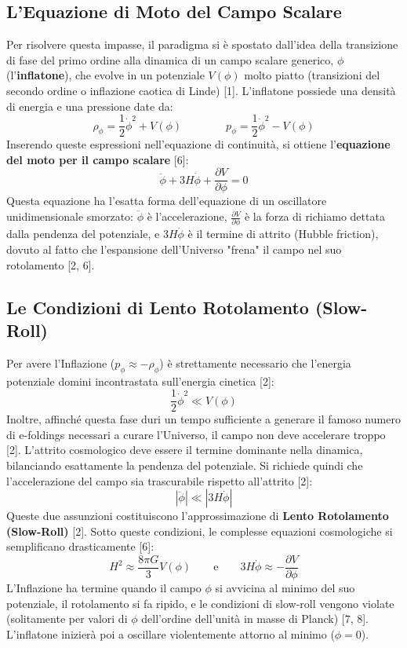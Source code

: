 \documentclass[11pt,a4paper]{report}
\begin{document}
\subsection{L'Equazione di Moto del Campo Scalare}
Per risolvere questa impasse, il paradigma si è spostato dall'idea della transizione di fase del primo ordine alla dinamica di un campo scalare generico, $\phi$ (l'\textbf{inflatone}), che evolve in un potenziale $V(\phi)$ molto piatto (transizioni del secondo ordine o inflazione caotica di Linde) [1].
L'inflatone possiede una densità di energia e una pressione date da:
\begin{equation}
\rho_\phi = \frac{1}{2}\dot{\phi}^2 + V(\phi) \qquad \qquad p_\phi = \frac{1}{2}\dot{\phi}^2 - V(\phi)
\end{equation}
Inserendo queste espressioni nell'equazione di continuità, si ottiene l'\textbf{equazione del moto per il campo scalare} [6]:
\begin{equation}
\ddot{\phi} + 3H\dot{\phi} + \frac{\partial V}{\partial \phi} = 0
\end{equation}
Questa equazione ha l'esatta forma dell'equazione di un oscillatore unidimensionale smorzato: $\ddot{\phi}$ è l'accelerazione, $\frac{\partial V}{\partial \phi}$ è la forza di richiamo dettata dalla pendenza del potenziale, e $3H\dot{\phi}$ è il termine di attrito (Hubble friction), dovuto al fatto che l'espansione dell'Universo "frena" il campo nel suo rotolamento [2, 6].

\subsection{Le Condizioni di Lento Rotolamento (Slow-Roll)}
Per avere l'Inflazione ($p_\phi \approx -\rho_\phi$) è strettamente necessario che l'energia potenziale domini incontrastata sull'energia cinetica [2]:
\begin{equation}
\frac{1}{2}\dot{\phi}^2 \ll V(\phi)
\end{equation}
Inoltre, affinché questa fase duri un tempo sufficiente a generare il famoso numero di e-foldings necessari a curare l'Universo, il campo non deve accelerare troppo [2]. L'attrito cosmologico deve essere il termine dominante nella dinamica, bilanciando esattamente la pendenza del potenziale. Si richiede quindi che l'accelerazione del campo sia trascurabile rispetto all'attrito [2]:
\begin{equation}
|\ddot{\phi}| \ll |3H\dot{\phi}|
\end{equation}
Queste due assunzioni costituiscono l'approssimazione di \textbf{Lento Rotolamento (Slow-Roll)} [2]. Sotto queste condizioni, le complesse equazioni cosmologiche si semplificano drasticamente [6]:
\begin{equation}
H^2 \approx \frac{8\pi G}{3} V(\phi) \qquad \text{e} \qquad 3H\dot{\phi} \approx -\frac{\partial V}{\partial \phi}
\end{equation}
L'Inflazione ha termine quando il campo $\phi$ si avvicina al minimo del suo potenziale, il rotolamento si fa ripido, e le condizioni di slow-roll vengono violate (solitamente per valori di $\phi$ dell'ordine dell'unità in masse di Planck) [7, 8]. L'inflatone inizierà poi a oscillare violentemente attorno al minimo ($\phi = 0$).
\end{document}
